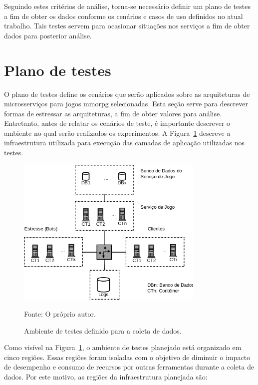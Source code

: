 Seguindo estes critérios de análise, torna-se necessário definir um plano de testes a fim de obter os dados conforme os cenários e casos de uso definidos no atual trabalho.
%
Tais testes servem para ocasionar situações nos serviços a fim de obter dados para posterior análise.



\section {Plano de testes}
\label{sec:plano}



O plano de testes define os cenários que serão aplicados sobre as arquiteturas de microsserviços para jogos \ac{mmorpg} selecionadas.
%
Esta seção serve para descrever formas de estressar as arquiteturas, a fim de obter valores para análise.
%
Entretanto, antes de relatar os cenários de teste, é importante descrever o ambiente no qual serão realizados os experimentos.
%
A Figura~\ref{Ambiente de testes} descreve a infraestrutura utilizada para execução das camadas de aplicação utilizadas nos testes.



\begin{figure}[htb!]
  \caption{Ambiente de testes definido para a coleta de dados.}
  \label{Ambiente de testes}
  \includegraphics[width=0.8\textwidth]{img/cap3/infraestrutura.png}
  \centering

  Fonte: O próprio autor.
\end{figure}



Como visível na Figura~\ref{Ambiente de testes}, o ambiente de testes planejado está organizado em cinco regiões.
%
Essas regiões foram isoladas com o objetivo de diminuir o impacto de desempenho e consumo de recursos por outras ferramentas durante a coleta de dados.
%
Por este motivo, as regiões da infraestrutura planejada são:



